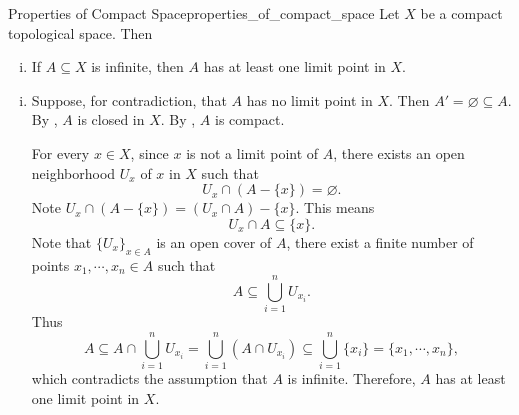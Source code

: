 \documentclass{report}
\begin{document}
\begin{proposition}{Properties of Compact Space}{properties_of_compact_space}
	Let $X$ be a compact topological space. Then
	\begin{enumerate}[(i)]
		\item If \(A\subseteq X\) is infinite, then \(A\) has at least one limit point in \(X\).
	\end{enumerate}
\end{proposition}
\begin{prf}
	\begin{enumerate}[(i)]
		\item  Suppose, for contradiction, that \(A\) has no limit point in \(X\). Then $A'=\varnothing \subseteq A$. By , $A$ is closed in $X$. By , $A$ is compact.
		
		For every \(x\in X\), since \(x\) is not a limit point of \(A\), there exists an open neighborhood \(U_x\) of \(x\) in \(X\) such that
	\[
		U_x\cap (A-\{x\})=\varnothing.
	\]
	Note $U_x\cap (A-\{x\}) =(U_x\cap A) - \{x\}$. This means 
	\[
		U_x\cap A\subseteq \{x\}.
	\]
	Note that \(\{U_x\}_{x\in A}\) is an open cover of \(A\), there exist a finite number of points $x_1, \cdots, x_n\in A$ such that
	\[
		A\subseteq \bigcup_{i=1}^n U_{x_i}.
	\]
    Thus
	\[
	   A\subseteq A \cap \bigcup_{i=1}^n U_{x_i} = \bigcup_{i=1}^n (A\cap U_{x_i}) \subseteq \bigcup_{i=1}^n \{x_i\} = \{x_1, \cdots, x_n\},
	\]
	which contradicts the assumption that $A$ is infinite. Therefore, \(A\) has at least one limit point in \(X\).
	\end{enumerate}
\end{prf}
\end{document}

